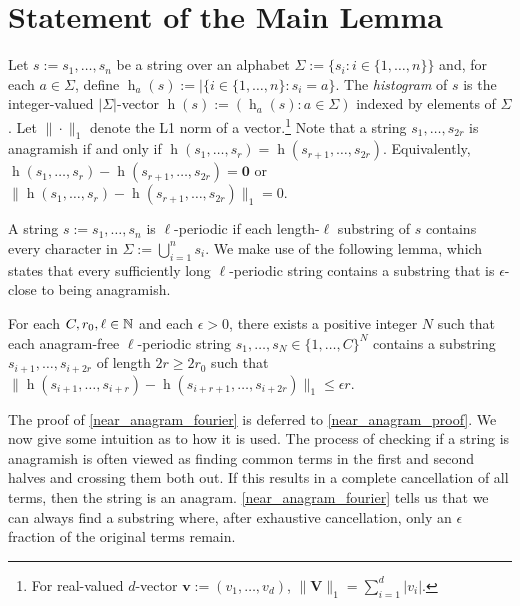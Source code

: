 \documentclass{patmorin}
\DeclareMathOperator{\hist}{h}
\begin{document}
\section{Statement of the Main Lemma}
\label{near_anagram_statement}

Let $s:=s_1,\ldots,s_n$ be a string over an alphabet $\Sigma:=\{s_i:i\in\{1,\ldots,n\}\}$ and, for each $a\in \Sigma$, define $\hist_a(s):=|\{i\in\{1,\ldots,n\}:s_i=a\}$.  The \emph{histogram} of $s$ is the integer-valued $|\Sigma|$-vector $\hist(s):=(\hist_a(s):a\in\Sigma)$ indexed by elements of $\Sigma$.  Let $\|\cdot\|_1$ denote the L1 norm of a vector.\footnote{For real-valued $d$-vector $\boldsymbol{v}:=(v_1,\ldots,v_d)$, $\|\boldsymbol{V}\|_1=\sum_{i=1}^d|v_i|$.}  Note that a string $s_1,\ldots,s_{2r}$ is anagramish if and only if $\hist(s_1,\ldots,s_r)=\hist(s_{r+1},\ldots,s_{2r})$.  Equivalently, $\hist(s_1,\ldots,s_r)-\hist(s_{r+1},\ldots,s_{2r})=\boldsymbol{0}$ or
$\|\hist(s_1,\ldots,s_r)-\hist(s_{r+1},\ldots,s_{2r})\|_1=0$.

A string $s:=s_1,\ldots,s_n$ is $\ell$-periodic if each length-$\ell$ substring of $s$ contains every character in $\Sigma:=\bigcup_{i=1}^n s_i$.  We make use of the following lemma, which states that every sufficiently long $\ell$-periodic string contains a substring that is $\epsilon$-close to being anagramish.

\begin{lem}\label{near_anagram_fourier}
    For each $C,r_0,\ell\in\mathbb{N}$ and each $\epsilon>0$, there exists a positive integer $N$ such that each anagram-free $\ell$-periodic string $s_1,\ldots,s_N\in\{1,\ldots,C\}^N$ contains a substring $s_{i+1},\ldots,s_{i+2r}$ of length $2r \ge 2r_0$ such that $\|\hist(s_{i+1},\ldots,s_{i+r})-\hist(s_{i+r+1},\ldots,s_{i+2r})\|_1 \le \epsilon r$.
\end{lem}

The proof of \cref{near_anagram_fourier} is deferred to \cref{near_anagram_proof}.  We now give some intuition as to how it is used.  The process of checking if a string is anagramish is often viewed as finding common terms in the first and second halves and crossing them both out.  If this results in a complete cancellation of all terms, then the string is an anagram.  \cref{near_anagram_fourier} tells us that we can always find a substring where, after exhaustive cancellation, only an $\epsilon$ fraction of the original terms remain.
\end{document}
